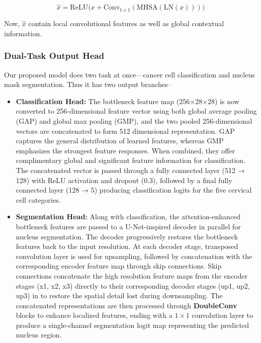 \documentclass[pdflatex,sn-nature]{sn-jnl}%
\theoremstyle{thmstyleone}%
\theoremstyle{thmstyletwo}%
\theoremstyle{thmstylethree}%
\begin{document}
$$\hat{x} = \mathrm{ReLU}\big(x + \mathrm{Conv}_{1\times1}(\mathrm{MHSA}(\mathrm{LN}(x)))\big)$$

Now, $\hat{x}$ contain local convolutional features as well as global contextual information. 

\subsubsection{Dual-Task Output Head}
Our proposed model does two task at once—cancer cell classification and nucleus mask segmentation. Thus it has two output branches-- 

\begin{itemize}

\item{\textbf{Classification Head:}} The bottleneck feature map (256×28×28) is now converted to 256-dimensional feature vector using both global average pooling (GAP) and global max pooling (GMP), and the two pooled 256-dimensional vectors are concatenated to form 512 dimensional representation. GAP captures the general distribution of learned features, whereas GMP emphasizes the strongest feature responses. When combined, they offer complimentary global and significant feature information for classification. The concatenated vector is passed through a fully connected layer (512 → 128) with ReLU activation and dropout (0.3), followed by a final fully connected layer (128 → 5) producing classification logits for the five cervical cell categories.

\item{\textbf{Segmentation Head:}}
Along with classification, the attention-enhanced bottleneck features are passed to a U-Net-inspired decoder in parallel for nucleus segmentation. The decoder progressively restores the  bottleneck features back to the input resolution. At each decoder stage, transposed convolution layer is used for upsampling, followed by concatenation with the corresponding encoder feature map through skip connections. Skip connections concatenate the high resolution feature maps from the encoder stages (x1, x2, x3) directly to their corresponding decoder stages (up1, up2, up3) in to restore the spatial detail lost during downsampling. The concatenated representations are then processed through \textbf{DoubleConv} blocks to enhance localized features, ending with a $1 \times 1$ convolution layer to produce a single-channel segmentation logit map representing the predicted nucleus region.
\end{itemize}
\end{document}
